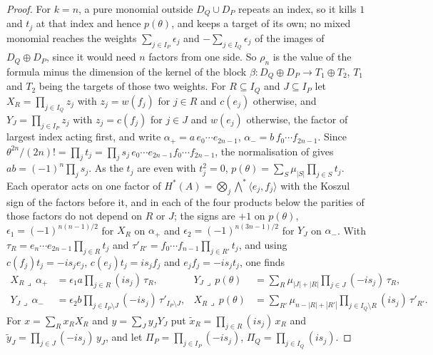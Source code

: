 \begin{proof}
For $k=n$, a pure monomial outside $D_{Q}\cup D_{P}$ repeats an index, so it
kills $1$ and $t_{j}$ at that index and hence $p(\theta)$, and keeps a target
of its own; no mixed monomial reaches the weights $\sum_{j\in I_{P}}
\epsilon_{j}$ and $-\sum_{j\in I_{Q}}\epsilon_{j}$ of the images of
$D_{Q}\oplus D_{P}$, since it would need $n$ factors from one side. So
$\rho_{n}$ is the value of the formula minus the dimension of the kernel of the
block $\beta\colon D_{Q}\oplus D_{P}\to T_{1}\oplus T_{2}$, $T_{1}$ and $T_{2}$
being the targets of those two weights. For $R\subseteq I_{Q}$ and
$J\subseteq I_{P}$ let $X_{R}=\prod_{j\in I_{Q}}z_{j}$ with $z_{j}=w(f_{j})$ for
$j\in R$ and $c(e_{j})$ otherwise, and $Y_{J}=\prod_{j\in I_{P}}z_{j}$ with
$z_{j}=c(f_{j})$ for $j\in J$ and $w(e_{j})$ otherwise, the factor of largest
index acting first, and write $\alpha_{+}=a\,e_{0}\cdots e_{2n-1}$,
$\alpha_{-}=b\,f_{0}\cdots f_{2n-1}$. Since
$\theta^{2n}/(2n)!=\prod_{j}t_{j}=\prod_{j}s_{j}\,e_{0}\cdots e_{2n-1}
f_{0}\cdots f_{2n-1}$, the normalisation of  gives
$ab=(-1)^{n}\prod_{j}s_{j}$. As the $t_{j}$ are even with $t_{j}^{2}=0$,
$p(\theta)=\sum_{S}\mu_{|S|}\prod_{j\in S}t_{j}$. Each operator acts on one
factor of $H^{*}(A)=\bigotimes_{j}\bigwedge^{*}\langle e_{j},f_{j}\rangle$
with the Koszul sign of the factors before it, and in each of the four
products below the parities of those factors do not depend on $R$ or $J$;
the signs are $+1$ on $p(\theta)$, $\epsilon_{1}=(-1)^{n(n-1)/2}$ for $X_{R}$ on
$\alpha_{+}$ and $\epsilon_{2}=(-1)^{n(3n-1)/2}$ for $Y_{J}$ on $\alpha_{-}$.
With $\tau_{R}=e_{n}\cdots e_{2n-1}\prod_{j\in R}t_{j}$ and
$\tau'_{R'}=f_{0}\cdots f_{n-1}\prod_{j\in R'}t_{j}$, and using
$c(f_{j})t_{j}=-is_{j}e_{j}$, $c(e_{j})t_{j}=is_{j}f_{j}$ and
$e_{j}f_{j}=-is_{j}t_{j}$, one finds
\begin{align*}
  X_{R}\lrcorner\,\alpha_{+}&=\epsilon_{1}a\prod_{j\in R}(is_{j})\,\tau_{R},&
  Y_{J}\lrcorner\,p(\theta)&=\sum_{R}\mu_{|J|+|R|}\prod_{j\in J}(-is_{j})\,\tau_{R},\\
  Y_{J}\lrcorner\,\alpha_{-}&=\epsilon_{2}b\prod_{j\in I_{P}\setminus J}(-is_{j})\,
    \tau'_{I_{P}\setminus J},&
  X_{R}\lrcorner\,p(\theta)&=\sum_{R'}\mu_{n-|R|+|R'|}\prod_{j\in I_{Q}\setminus R}
    (is_{j})\,\tau'_{R'}.
\end{align*}
For $x=\sum_{R}x_{R}X_{R}$ and $y=\sum_{J}y_{J}Y_{J}$ put
$\tilde x_{R}=\prod_{j\in R}(is_{j})\,x_{R}$ and
$\tilde y_{J}=\prod_{j\in J}(-is_{j})\,y_{J}$, and let
$\Pi_{P}=\prod_{j\in I_{P}}(-is_{j})$, $\Pi_{Q}=\prod_{j\in I_{Q}}(is_{j})$.

\end{proof}
